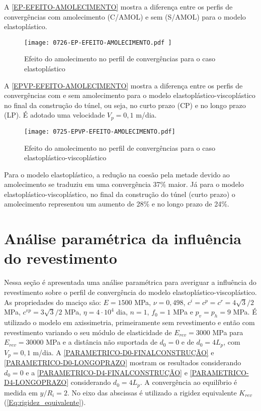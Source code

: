 A \autoref{EP-EFEITO-AMOLECIMENTO} mostra a diferença entre os perfis de convergências com amolecimento (C/AMOL) e sem (S/AMOL) para o modelo elastoplástico.

\begin{figure}[H]
	\begin{center}
		\texttt{[image: 0726-EP-EFEITO-AMOLECIMENTO.pdf
		]}
	\end{center}
	\caption{\label{EP-EFEITO-AMOLECIMENTO}Efeito do amolecimento no perfil de convergências para o caso elastoplástico}
\end{figure}

A \autoref{EPVP-EFEITO-AMOLECIMENTO} mostra a diferença entre os perfis de convergências com e sem amolecimento para o modelo elastoplástico-viscoplástico no final da construção do túnel, ou seja, no curto prazo (CP) e no longo prazo (LP). É adotado uma velocidade $V_p=0,1$ m/dia.

\begin{figure}[H]
	\begin{center}
		\texttt{[image: 0725-EPVP-EFEITO-AMOLECIMENTO.pdf]}
	\end{center}
	\caption{\label{EPVP-EFEITO-AMOLECIMENTO}Efeito do amolecimento no perfil de convergências para o caso elastoplástico-viscoplástico}
\end{figure}

Para o modelo elastoplástico, a redução na coesão pela metade devido ao amolecimento se traduziu em uma convergência 37\% maior. Já para o modelo elastoplástico-viscoplástico, no final da construção do túnel (curto prazo) o amolecimento representou um aumento de 28\% e no longo prazo de 24\%.


\section{Análise paramétrica da influência do revestimento}

Nessa seção é apresentada uma análise paramétrica para averiguar a influência do revestimento sobre o perfil de convergência do modelo elastoplástico-viscoplástico. As propriedades do maciço são: $E=1500$ MPa, $\nu=0,498$, $c^i=c^p=c^r =4\sqrt{3}/2$ MPa, $c^{vp}=3\sqrt{3}/2$ MPa, $\eta = 4 \cdot 10^4$ dia, $n=1$, $f_0=1$ MPa e $p_v=p_h=9$ MPa. É utilizado o modelo em axissimetria, primeiramente sem revestimento e então com revestimento variando o seu módulo de elasticidade de $E_{rev} = 3000$ MPa para $E_{rev} = 30000$ MPa e a distância não suportada de $d_0 = 0$ e de $d_0 = 4L_p$, com $V_p=0,1$ m/dia. A \autoref{PARAMETRICO-D0-FINALCONSTRUÇÃO} e \autoref{PARAMETRICO-D0-LONGOPRAZO} mostram os resultados considerando $d_0 = 0$ e a \autoref{PARAMETRICO-D4-FINALCONSTRUÇÃO} e \autoref{PARAMETRICO-D4-LONGOPRAZO} considerando $d_0=4L_p$. A convergência ao equilíbrio é medida em $y/R_i = 2$. No eixo das abscissas é utilizado a rigidez equivalente $K_{rev}$ (\ref{Eq:rigidez_equivalente}).

